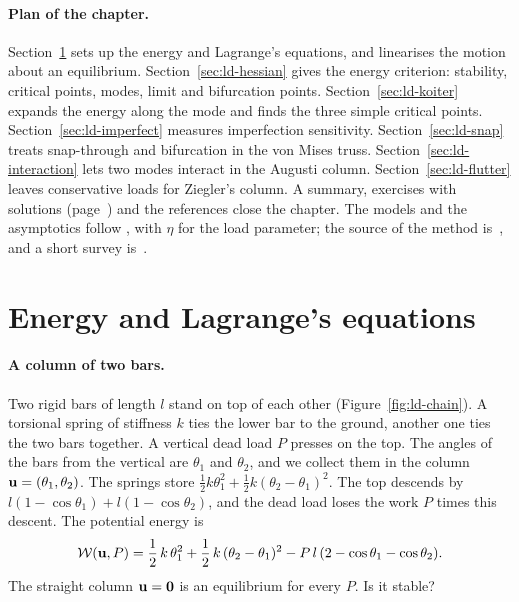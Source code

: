 \paragraph{Plan of the chapter.}
Section~\ref{sec:ld-lagrange} sets up the energy and Lagrange's equations, and
linearises the motion about an equilibrium. Section~\ref{sec:ld-hessian} gives the
energy criterion: stability, critical points, modes, limit and bifurcation points.
Section~\ref{sec:ld-koiter} expands the energy along the mode and finds the three
simple critical points. Section~\ref{sec:ld-imperfect} measures
imperfection sensitivity. Section~\ref{sec:ld-snap} treats snap-through and
bifurcation in the von Mises truss. Section~\ref{sec:ld-interaction} lets two modes
interact in the Augusti column. Section~\ref{sec:ld-flutter} leaves conservative
loads for Ziegler's column. A summary, exercises with solutions
(page~\pageref{sec:ld-exo}) and the references close the chapter. The models and
the asymptotics follow \cite{ld-thompson1973,ld-triantafyllidis2011}, with $\eta$
for the load parameter; the source of the method is~\cite{ld-koiter1945}, and a
short survey is~\cite{ld-hutchinson1970}.

\section{Energy and Lagrange's equations}\label{sec:ld-lagrange}
%

\paragraph{A column of two bars.}
Two rigid bars of length $l$ stand on top of each other
(Figure~\ref{fig:ld-chain}). A torsional spring of stiffness $k$ ties the lower
bar to the ground, another one ties the two bars together. A vertical dead load
$P$ presses on the top. The angles of the bars from the vertical are $\theta_1$ and
$\theta_2$, and we collect them in the column $\mathbf{u} = (\theta_1,\theta_2)$. The
springs store $\tfrac12 k\theta_1^2 + \tfrac12 k(\theta_2 - \theta_1)^2$. The top
descends by $l(1 - \cos\theta_1) + l(1 - \cos\theta_2)$, and the dead load loses the
work $P$ times this descent. The potential energy is
\begin{equation}\label{eq:ld-chain-energy}
  \mathcal{W}(\mathbf{u},P) = \frac12\,k\,\theta_1^2 + \frac12\,k\,(\theta_2 - \theta_1)^2
  - P\,l\,(2 - \cos\theta_1 - \cos\theta_2) .
\end{equation}
The straight column $\mathbf{u} = \mathbf{0}$ is an equilibrium for every $P$. Is it stable?


